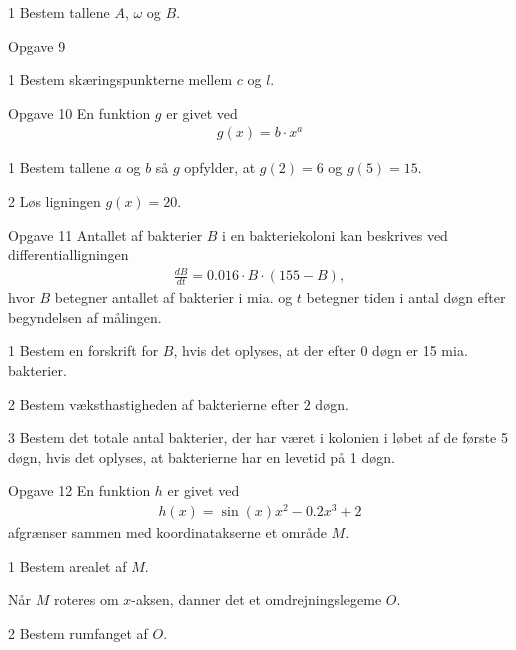 \documentclass[12pt,x11names,a4paper]{article}
\begin{document}
\begin{delopgave}{1}
	Bestem tallene $A$, $\omega$ og $B$. 
\end{delopgave}	
%
%
%
%
%
\begin{opgavetekst}{Opgave 9}
	
\end{opgavetekst}
\begin{delopgave}{1}
	Bestem skæringspunkterne mellem $c$ og $l$.
\end{delopgave}
%
%
%
%
%
%
\begin{opgavetekst}{Opgave 10}
	En funktion $g$ er givet ved
	\begin{align*}
		g(x) = b\cdot x^a
	\end{align*}
\end{opgavetekst}
\begin{delopgave}{1}
	Bestem tallene $a$ og $b$ så $g$ opfylder, at $g(2) = 6$ og $g(5) = 15$.
\end{delopgave}
\begin{delopgave}{2}
	Løs ligningen $g(x) = 20$.
\end{delopgave}
%
%
%
%
%
\newpage
\begin{opgavetekst}{Opgave 11}
	Antallet af bakterier $B$ i en bakteriekoloni kan beskrives ved differentialligningen
	\begin{align*}
		\frac{dB}{dt} = 0.016\cdot B\cdot (155 - B),
	\end{align*}
	hvor $B$ betegner antallet af bakterier i mia. og $t$ betegner tiden i antal døgn efter begyndelsen af målingen.
\end{opgavetekst}
\begin{delopgave}{1}
	Bestem en forskrift for $B$, hvis det oplyses, at der efter $0$ døgn er 15 mia. bakterier. 
\end{delopgave}
\begin{delopgave}{2}
	Bestem væksthastigheden af bakterierne efter $2$ døgn. 
\end{delopgave}
\begin{delopgave}{3}
	Bestem det totale antal bakterier, der har været i kolonien i løbet af de første 5 døgn, hvis det oplyses, at bakterierne har en levetid på 1 døgn.
\end{delopgave}
%
%
%
%
%
\begin{opgavetekst}{Opgave 12}
	En funktion $h$ er givet ved 
	\begin{align*}
		h(x) = \sin(x)x^2 - 0.2x^3 + 2
	\end{align*}
	afgrænser sammen med koordinatakserne et område $M$.
\end{opgavetekst}	
\begin{delopgave}{1}
	Bestem arealet af $M$. 
\end{delopgave}
\begin{meretekst}
	Når $M$ roteres om $x$-aksen, danner det et omdrejningslegeme $O$.
\end{meretekst}
\begin{delopgave}{2}
	Bestem rumfanget af $O$. 
\end{delopgave}
\end{document}
